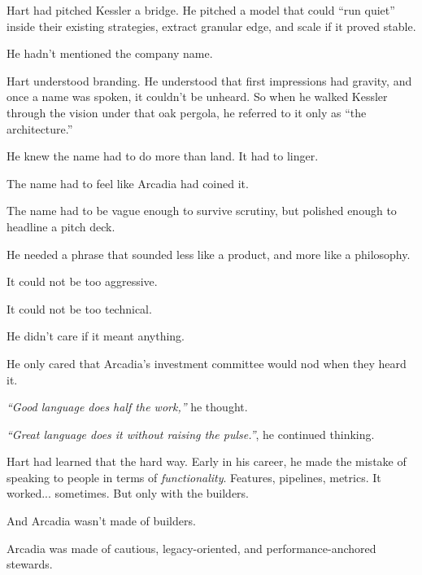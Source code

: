 Hart had pitched Kessler a bridge.
He pitched a model that could “run quiet” inside their existing strategies, extract granular edge, and scale 
if it proved stable.

He hadn’t mentioned the company name.

Hart understood branding. He understood that first impressions had gravity, and once a name was spoken, it couldn’t 
be unheard.
So when he walked Kessler through the vision under that oak pergola, he referred to it only as “the architecture.”

He knew the name had to do more than land. It had to linger.

The name had to feel like Arcadia had coined it.

The name had to be vague enough to survive scrutiny, but polished enough to headline a pitch deck.

He needed a phrase that sounded less like a product, and more like a philosophy.

It could not be too aggressive.  

It could not be too technical.  

He didn’t care if it meant anything.

He only cared that Arcadia’s investment committee would nod when they heard it.

\textit{“Good language does half the work,”} he thought.  

\textit{“Great language does it without raising the pulse.”}, he continued thinking.

Hart had learned that the hard way.  
Early in his career, he made the mistake of speaking to people in terms of \textit{functionality}.  
Features, pipelines, metrics. It worked... sometimes.  
But only with the builders.

And Arcadia wasn’t made of builders.  

Arcadia was made of cautious, legacy-oriented, and performance-anchored stewards.  

They didn’t buy edge.  They bought insurance against irrelevance.

That meant no techno-optimism. And no blitzscale vocabulary.  
Just control, control, and more control.

\textit{“They don’t want disruption,”} Hart reminded himself. 

\textit{“They want continuity... with a story that makes it feel like a breakthrough.”}, he continued saying to himself.

\textbf{Cycle-resilient alpha} was that story.

